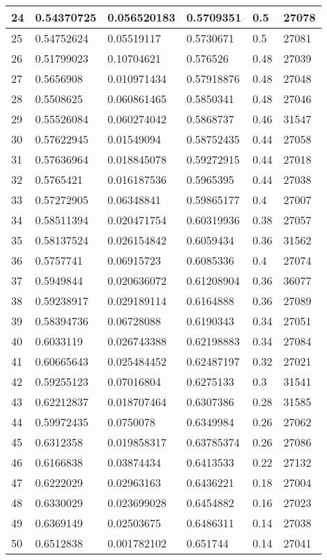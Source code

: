 \begin{longtable}{|l|l|l|l|l|l|}
24 & 0.54370725 & 0.056520183 & 0.5709351 & 0.5 & 27078 \\ \hline 
25 & 0.54752624 & 0.05519117 & 0.5730671 & 0.5 & 27081 \\ \hline 
26 & 0.51799023 & 0.10704621 & 0.576526 & 0.48 & 27039 \\ \hline 
27 & 0.5656908 & 0.010971434 & 0.57918876 & 0.48 & 27048 \\ \hline 
28 & 0.5508625 & 0.060861465 & 0.5850341 & 0.48 & 27046 \\ \hline 
29 & 0.55526084 & 0.060274042 & 0.5868737 & 0.46 & 31547 \\ \hline 
30 & 0.57622945 & 0.01549094 & 0.58752435 & 0.44 & 27058 \\ \hline 
31 & 0.57636964 & 0.018845078 & 0.59272915 & 0.44 & 27018 \\ \hline 
32 & 0.5765421 & 0.016187536 & 0.5965395 & 0.44 & 27038 \\ \hline 
33 & 0.57272905 & 0.06348841 & 0.59865177 & 0.4 & 27007 \\ \hline 
34 & 0.58511394 & 0.020471754 & 0.60319936 & 0.38 & 27057 \\ \hline 
35 & 0.58137524 & 0.026154842 & 0.6059434 & 0.36 & 31562 \\ \hline 
36 & 0.5757741 & 0.06915723 & 0.6085336 & 0.4 & 27074 \\ \hline 
37 & 0.5949844 & 0.020636072 & 0.61208904 & 0.36 & 36077 \\ \hline 
38 & 0.59238917 & 0.029189114 & 0.6164888 & 0.36 & 27089 \\ \hline 
39 & 0.58394736 & 0.06728088 & 0.6190343 & 0.34 & 27051 \\ \hline 
40 & 0.6033119 & 0.026743388 & 0.62198883 & 0.34 & 27084 \\ \hline 
41 & 0.60665643 & 0.025484452 & 0.62487197 & 0.32 & 27021 \\ \hline 
42 & 0.59255123 & 0.07016804 & 0.6275133 & 0.3 & 31541 \\ \hline 
43 & 0.62212837 & 0.018707464 & 0.6307386 & 0.28 & 31585 \\ \hline 
44 & 0.59972435 & 0.0750078 & 0.6349984 & 0.26 & 27062 \\ \hline 
45 & 0.6312358 & 0.019858317 & 0.63785374 & 0.26 & 27086 \\ \hline 
46 & 0.6166838 & 0.03874434 & 0.6413533 & 0.22 & 27132 \\ \hline 
47 & 0.6222029 & 0.02963163 & 0.6436221 & 0.18 & 27004 \\ \hline 
48 & 0.6330029 & 0.023699028 & 0.6454882 & 0.16 & 27023 \\ \hline 
49 & 0.6369149 & 0.02503675 & 0.6486311 & 0.14 & 27038 \\ \hline 
50 & 0.6512838 & 0.001782102 & 0.651744 & 0.14 & 27041 \\ \hline 
\end{longtable}